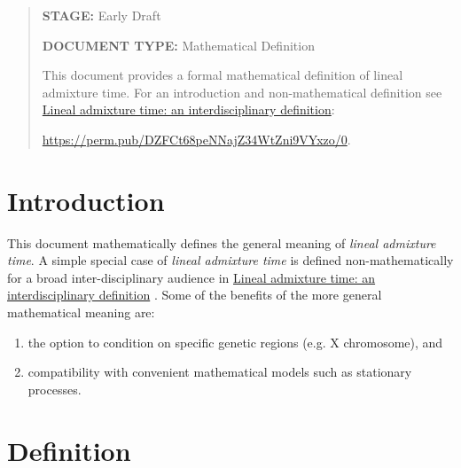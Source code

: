 





\newcommand{\dom}{\operatorname{dom}}
\newcommand{\mathstop}{\text{ .}}

\newcommand{\Tim}{\mathrm{Tim}}
\newcommand{\Hap}{\mathrm{Hap}}
\newcommand{\Dip}{\mathrm{Dip}}
\newcommand{\Par}{\mathrm{Par}}
\newcommand{\Pat}{\mathrm{Pat}}
\newcommand{\Loc}{\mathrm{Loc}}
\newcommand{\Lin}{\mathrm{Lin}}
\newcommand{\Fert}{\mathrm{Fert}}
\newcommand{\Mrlt}{\mathrm{Mrlt}}
\newcommand{\Lat}{\mathrm{Lat}}
\newcommand{\Cat}{\mathrm{Cat}}


\begin{abstract}
\textbf{STAGE:} Early Draft

\textbf{DOCUMENT TYPE:} Mathematical Definition

This document provides a formal mathematical definition of lineal
admixture time. For an introduction and non-mathematical definition see
\href{https://perm.pub/DZFCt68peNNajZ34WtZni9VYxzo/0}{Lineal admixture time: an interdisciplinary definition}:

\href{https://perm.pub/DZFCt68peNNajZ34WtZni9VYxzo/0}{https://perm.pub/DZFCt68peNNajZ34WtZni9VYxzo/0}.
\end{abstract}

\section{Introduction}

This document mathematically defines the general meaning of \emph{lineal admixture time}.
A simple special case of \emph{lineal admixture time} is defined non-mathematically
for a broad inter-disciplinary audience in
\href{https://perm.pub/DZFCt68peNNajZ34WtZni9VYxzo/0}{Lineal admixture time: an interdisciplinary definition}
\cite{dsi:DZ/0}.
Some of the benefits of the more general mathematical meaning are:
\begin{enumerate}
\item the option to condition on specific genetic regions (e.g. X chromosome), and
\item compatibility with convenient mathematical models such as stationary processes.
\end{enumerate}


\section{Definition}

